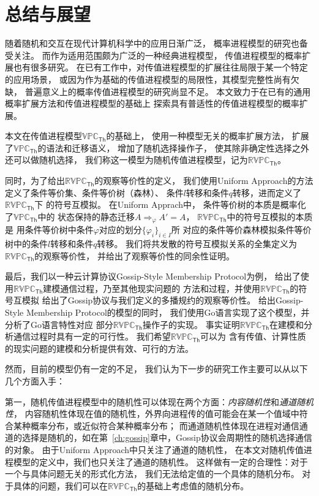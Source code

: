 \chapter{总结与展望}

随着随机和交互在现代计算机科学中的应用日渐广泛，
概率进程模型的研究也备受关注。
而作为适用范围颇为广泛的一种经典进程模型，
传值进程模型的概率扩展也有很多研究。
在已有工作中，对传值进程模型的扩展往往局限于某一个特定的应用场景，
或因为作为基础的传值进程模型的局限性，其模型完整性尚有欠缺，
普遍意义上的概率传值进程模型的研究尚显不足。
本文致力于在已有的通用概率扩展方法和传值进程模型的基础上
探索具有普适性的传值进程模型的概率扩展。

本文在传值进程模型$\mathbb{VPC}_{\mathsf{Th}}$的基础上，
使用一种模型无关的概率扩展方法，
扩展了$\mathbb{VPC}_{\mathsf{Th}}$的语法和迁移语义，
增加了随机选择操作子，
使其除非确定性选择之外还可以做随机选择，
我们称这一模型为随机传值进程模型，记为$\mathbb{RVPC}_{\mathsf{Th}}$。

同时，为了给出$\mathbb{RVPC}_{\mathsf{Th}}$的观察等价性的定义，
我们使用Uniform Approach的方法定义了条件等价集、条件等价树（森林）、
条件$l$转移和条件$q$转移，进而定义了$\mathbb{RVPC}_{\mathsf{Th}}$下
的符号互模拟。
在Uniform Apprach中，
条件等价树的本质是概率化了$\mathbb{VPC}_{\mathsf{Th}}$中的
状态保持的静态迁移$A\Rightarrow_{\varphi}A'=A$，
$\mathbb{RVPC}_{\mathsf{Th}}$中的符号互模拟的本质是
用条件等价树中条件$\varphi$对应的划分$\{\varphi_i\}_{i\in I}$所
对应的条件等价森林模拟条件等价树中的条件$l$转移和条件$q$转移。
我们将共发散的符号互模拟关系的全集定义为$\mathbb{RVPC}_{\mathsf{Th}}$的观察等价性，
并给出了观察等价性的同余性证明。

最后，我们以一种云计算协议Gossip-Style Membership Protocol为例，
给出了使用$\mathbb{RVPC}_{\mathsf{Th}}$建模通信过程，乃至其他现实问题的
方法和过程，并使用$\mathbb{RVPC}_{\mathsf{Th}}$的符号互模拟
给出了Gossip协议与我们定义的多播规约的观察等价性。
给出Gossip-Style Membership Protocol的模型的同时，
我们使用Go语言实现了这个模型，并分析了Go语言特性对应
部分$\mathbb{RVPC}_{\mathsf{Th}}$操作子的实现。
事实证明$\mathbb{RVPC}_{\mathsf{Th}}$在建模和分析通信过程时具有一定的可行性。
我们希望$\mathbb{RVPC}_{\mathsf{Th}}$可以为
含有传值、计算性质的现实问题的建模和分析提供有效、可行的方法。

然而，目前的模型仍有一定的不足，
我们认为下一步的研究工作主要可以从以下几个方面入手：

第一，随机传值进程模型中的随机性可以体现在两个方面：\textit{内容随机性}和\textit{通道随机性}，
内容随机性体现在值的随机性，外界向进程传的值可能会在某一个值域中符合某种概率分布，或近似符合某种概率分布；
而通道随机性体现在进程对通信通道的选择是随机的，如在第~\ref{ch:gossip}章中，Gossip协议会周期性的随机选择通信的对象。
由于Uniform Approach中只关注了通道的随机性，
在本文对随机传值进程模型的定义中，我们也只关注了通道的随机性。
这样做有一定的合理性：对于一个与具体问题无关的形式化方法，
我们无法给定值的一个具体的随机分布。
对于具体的问题，我们可以在$\mathbb{RVPC}_{\mathsf{Th}}$的基础上考虑值的随机分布。


